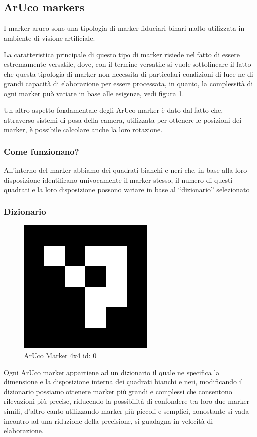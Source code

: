 \documentclass[12pt,a4paper,openright,twoside]{book}
\begin{document}
\subsection{ArUco markers} \label{subsec:aruco_markers}
I marker \acrfull{aruco} sono una tipologia di marker fiduciari binari molto utilizzata in ambiente di visione artificiale.

La caratteristica principale di questo tipo di marker risiede nel fatto di essere estremamente versatile, dove,
con il termine versatile si vuole sottolineare il fatto che questa tipologia di marker non necessita di particolari condizioni di luce ne di grandi capacità di elaborazione per essere processata, in quanto, la complessità di ogni marker può variare in base alle esigenze, vedi figura \ref{fig:aruco_marker_0}.

Un altro aspetto fondamentale degli ArUco marker è dato dal fatto che, attraverso sistemi di posa della camera, utilizzata per ottenere le posizioni dei marker, è possibile calcolare anche la loro rotazione.

\subsubsection{Come funzionano?}
All'interno del marker abbiamo dei quadrati bianchi e neri che, in base alla loro disposizione identificano univocamente il marker stesso, il numero di questi quadrati e la loro disposizione possono variare in base al ``dizionario'' selezionato

\subsubsection{Dizionario} \label{subsubsec:dizionario}
\begin{figure}[h!]
	\centering
	\includegraphics[width=0.5\linewidth]{./figures/4x4_1000-0.png}
	\caption{ArUco Marker 4x4 id: 0}
	\label{fig:aruco_marker_0}
\end{figure}
Ogni ArUco marker appartiene ad un dizionario il quale ne specifica la dimensione e la disposizione interna dei quadrati bianchi e neri, modificando il dizionario possiamo ottenere marker più grandi e complessi che consentono rilevazioni più precise, riducendo la possibilità di confondere tra loro due marker simili, d'altro canto utilizzando marker più piccoli e semplici, nonostante si vada incontro ad una riduzione della precisione, si guadagna in velocità di elaborazione. \cite{reverseEngineeringArucoMarkers}
 
\end{document}
